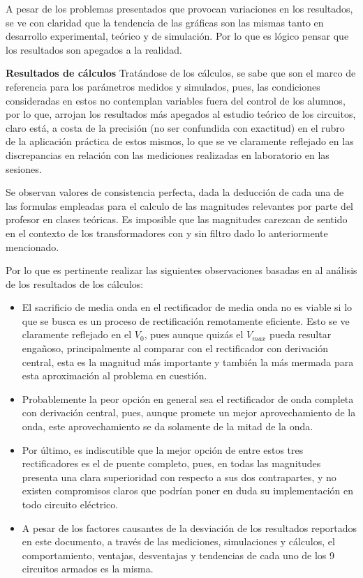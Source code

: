 \documentclass[12pt]{article}
\begin{document}
\begin{itemize}
        A pesar de los problemas presentados que provocan variaciones en los resultados, se ve con claridad que la tendencia
        de las gráficas son las mismas tanto en desarrollo experimental, teórico y de simulación. Por lo que es lógico pensar
        que los resultados son apegados a la realidad.
        \par\textbf{Resultados de cálculos}
        Tratándose de los cálculos, se sabe que son el marco de referencia para los parámetros medidos y simulados, pues, las condiciones consideradas en estos no contemplan variables fuera del control de los alumnos, por lo que, arrojan los resultados más apegados al estudio teórico de los circuitos, claro está, a costa
        de la precisión (no ser confundida con exactitud) en el rubro de la aplicación práctica de estos mismos, lo que se ve claramente reflejado en las discrepancias en relación con las mediciones realizadas en laboratorio en las sesiones.\par
        Se observan valores de consistencia perfecta, dada la deducción de cada una de las formulas empleadas para el calculo de las magnitudes relevantes por parte del profesor en clases teóricas. Es imposible que las magnitudes carezcan de sentido en el contexto de los transformadores con y sin filtro dado lo anteriormente mencionado.\par
        Por lo que es pertinente realizar las siguientes observaciones basadas en al análisis de los resultados de los cálculos:
        \begin{itemize}
            \item El sacrificio de media onda en el rectificador de media onda no es viable si lo que se busca es un proceso de rectificación remotamente eficiente. Esto se ve claramente reflejado en el $V_0$, pues aunque quizás el $V_{max}$ pueda resultar engañoso, principalmente al comparar con el rectificador con derivación central, esta es la magnitud más importante
            y también la más mermada para esta aproximación al problema en cuestión.
            \item Probablemente la peor opción en general sea el rectificador de onda completa con derivación central, pues, aunque promete un mejor aprovechamiento de la onda, este aprovechamiento se da solamente de la mitad de la onda.
            \item Por último, es indiscutible que la mejor opción de entre estos tres rectificadores es el de puente completo, pues, en todas las magnitudes presenta una clara superioridad con respecto a sus dos contrapartes, y no existen compromisos claros que podrían poner en duda su implementación en todo circuito eléctrico. 
            \item A pesar de los factores causantes de la desviación de los resultados reportados en este documento, a través de las mediciones, simulaciones y cálculos, el comportamiento, ventajas, desventajas y tendencias de cada uno de los 9 circuitos armados es la misma.   
        \end{itemize}



        \end{itemize}
\end{document}
